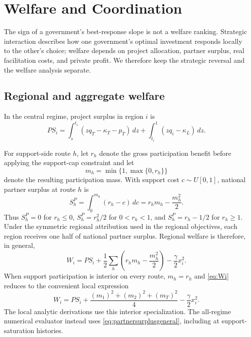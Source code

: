 \section{Welfare and Coordination}\label{sec:welfare}

The sign of a government's best-response slope is not a welfare ranking. Strategic interaction describes how one government's optimal investment responds locally to the other's choice; welfare depends on project allocation, partner surplus, real facilitation costs, and private profit. We therefore keep the strategic reversal and the welfare analysis separate.

\subsection{Regional and aggregate welfare}

In the central regime, project surplus in region $i$ is
\begin{equation}
PS_i
=
\int_s^{t_i}(zq_T-\kappa_T-p_T)\,dz
+
\int_{t_i}^{1}(zq_i-\kappa_L)\,dz .
\label{eq:PS}
\end{equation}

For support-side route $h$, let $r_h$ denote the gross participation benefit before applying the support-cap constraint and let
\[
m_h=\min\{1,\max\{0,r_h\}\}
\]
denote the resulting participation mass. With support cost $c\sim U[0,1]$, national partner surplus at route $h$ is
\begin{equation}
S_h^P
=\int_0^{m_h}(r_h-c)\,dc
=r_hm_h-\frac{m_h^2}{2}.
\label{eq:partnersurplusgeneral}
\end{equation}
Thus $S_h^P=0$ for $r_h\leq0$, $S_h^P=r_h^2/2$ for $0<r_h<1$, and $S_h^P=r_h-1/2$ for $r_h\geq1$. Under the symmetric regional attribution used in the regional objectives, each region receives one half of national partner surplus. Regional welfare is therefore, in general,
\begin{equation}
W_i
=
PS_i
+\frac12\sum_h\left(r_hm_h-\frac{m_h^2}{2}\right)
-\frac{\gamma}{2}x_i^2.
\label{eq:Wi}
\end{equation}
When support participation is interior on every route, $m_h=r_h$ and \eqref{eq:Wi} reduces to the convenient local expression
\[
W_i
=PS_i+\frac{(m_1)^2+(m_2)^2+(m_T)^2}{4}-\frac{\gamma}{2}x_i^2.
\]
The local analytic derivations use this interior specialization. The all-regime numerical evaluator instead uses \eqref{eq:partnersurplusgeneral}, including at support-saturation histories.

